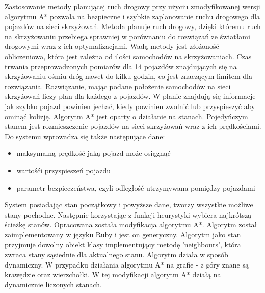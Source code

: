 Zastosowanie metody planującej ruch drogowy przy użyciu zmodyfikowanej wersji algorytmu A* pozwala na bezpieczne i szybkie zaplanowanie ruchu drogowego dla pojazdów na sieci skrzyżowań. Metoda planuje ruch drogowy, dzięki któremu ruch na skrzyżowaniu przebiega sprawniej w porównaniu do rozwiązań ze światłami drogowymi wraz z ich optymalizacjami. Wadą metody jest złożoność obliczeniowa, która jest zależna od ilości samochodów na skrzyżowaniach. Czas trwania przeprowadzonych pomiarów dla 14 pojazdów znajdujących się na skrzyżowaniu ośmiu dróg nawet do kilku godzin, co jest znaczącym limitem dla rozwiązania.
\newline
\newline
Rozwiązanie, mając podane położenie samochodów na sieci skrzyżowań liczy plan dla każdego z pojazdów. W planie znajdują się informacje jak szybko pojazd powinien jechać, kiedy powinien zwolnić lub przyspieszyć aby ominąć kolizję.
\newline
\newline
Algorytm A* jest oparty o działanie na stanach. Pojedyńczym stanem jest rozmieszczenie pojazdów na sieci skrzyżowań wraz z ich prędkościami.
\newline
\newline
Do systemu wprowadza się także następujące dane:
\begin{itemize}
\item maksymalną prędkość jaką pojazd może osiągnąć
\item wartośći przyspieszeń pojazdu
\item parametr bezpieczeństwa, czyli odległość utrzymywana pomiędzy pojazdami
\end{itemize}
System posiadając stan początkowy i powyższe dane, tworzy wszystkie możliwe stany pochodne. Następnie korzystając z funkcji heurystyki wybiera najkrótszą ścieżkę stanów.
\newline
\newline
Opracowana została modyfikacja algorytmu A*. Algorytm został zaimplementowany w języku Ruby i jest on generyczny. Algorytm jako stan przyjmuje dowolny obiekt klasy implementujący metodę 'neighbours', która zwraca stany sąsiednie dla aktualnego stanu.
\newline
\newline
Algorytm działa w sposób dynamiczny. W przypadku działania algorytmu A* na grafie - z góry znane są krawędzie oraz wierzchołki. W tej modyfikacji algorytm A* działą na dynamicznie liczonych stanach.
\newline
\newline
